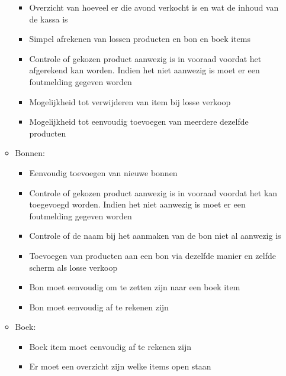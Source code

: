 \begin{itemize}
\begin{itemize}
        \begin{itemize}%
        \item Overzicht van hoeveel er die avond verkocht is en wat de inhoud van de kassa is
        \item Simpel afrekenen van lossen producten en bon en boek items
        \item Controle of gekozen product aanwezig is in vooraad voordat het afgerekend kan worden. Indien het niet aanwezig is moet er een foutmelding gegeven worden
        \item Mogelijkheid tot verwijderen van item bij losse verkoop
        \item Mogelijkheid tot eenvoudig toevoegen van meerdere dezelfde producten
        \end{itemize}%
        \item Bonnen:
        \begin{itemize}%
        \item Eenvoudig toevoegen van nieuwe bonnen
        \item Controle of gekozen product aanwezig is in vooraad voordat het kan toegevoegd worden. Indien het niet aanwezig is moet er een foutmelding gegeven worden
        \item Controle of de naam bij het aanmaken van de bon niet al aanwezig is
        \item Toevoegen van producten aan een bon via dezelfde manier en zelfde scherm als losse verkoop
        \item Bon moet eenvoudig om te zetten zijn naar een boek item
        \item Bon moet eenvoudig af te rekenen zijn
        \end{itemize}%
        \item Boek:
        \begin{itemize}%
        \item Boek item moet eenvoudig af te rekenen zijn
        \item Er moet een overzicht zijn welke items open staan
        
        \end{itemize}%
        \end{itemize}%
        

\end{itemize}
